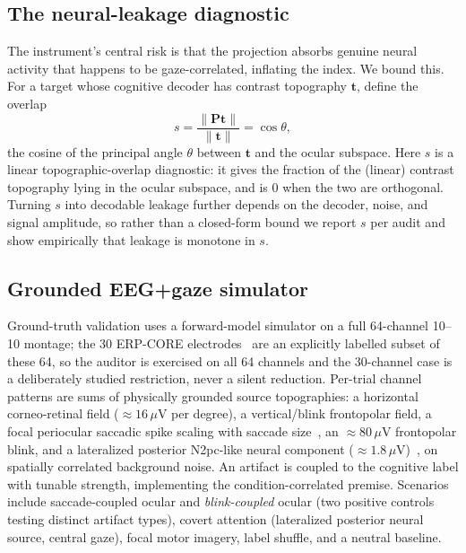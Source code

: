 \documentclass[conference]{IEEEtran}
\begin{document}
\subsection{The neural-leakage diagnostic}

The instrument's central risk is that the projection absorbs genuine neural activity that
happens to be gaze-correlated, inflating the index. We bound this. For a target whose cognitive
decoder has contrast topography $\mathbf{t}$, define the overlap
\begin{equation}
s=\frac{\lVert\mathbf{P}\mathbf{t}\rVert}{\lVert\mathbf{t}\rVert}=\cos\theta,
\label{eq:overlap}
\end{equation}
the cosine of the principal angle $\theta$ between $\mathbf{t}$ and the ocular subspace. Here
$s$ is a linear topographic-overlap diagnostic: it gives the fraction of the (linear) contrast
topography lying in the ocular subspace, and is $0$ when the two are orthogonal. Turning $s$ into
decodable leakage further depends on the decoder, noise, and signal amplitude, so rather than a
closed-form bound we report $s$ per audit and show empirically that leakage is monotone in $s$.

\subsection{Grounded EEG+gaze simulator}

Ground-truth validation uses a forward-model simulator on a full 64-channel 10--10
montage; the 30 ERP-CORE electrodes~\cite{kappenman2021erpcore} are an explicitly labelled
subset of these 64, so the auditor is exercised on all 64 channels and
the 30-channel case is a deliberately studied restriction, never a silent reduction. Per-trial
channel patterns are sums of physically grounded source topographies: a horizontal corneo-retinal field ($\approx 16\,\mu$V per degree), a
vertical/blink frontopolar field, a focal periocular saccadic spike scaling with saccade
size~\cite{keren2010saccadic}, an $\approx 80\,\mu$V frontopolar blink, and a lateralized
posterior N2pc-like neural component ($\approx 1.8\,\mu$V)~\cite{luck1994n2pc}, on spatially
correlated background noise. An artifact is coupled to the cognitive label with tunable
strength, implementing the condition-correlated premise. Scenarios include saccade-coupled
ocular and \emph{blink-coupled} ocular (two positive controls testing distinct artifact types),
covert attention (lateralized posterior neural source, central gaze), focal motor imagery,
label shuffle, and a neutral baseline.
\end{document}
